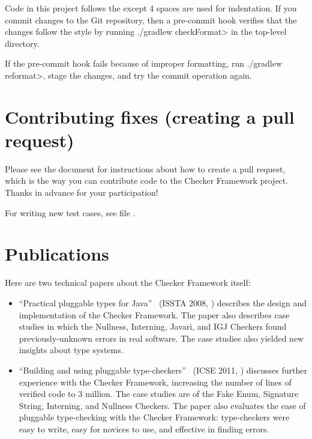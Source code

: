 Code in this project follows the
 except 4 spaces are used for indentation.  If you commit changes to the
Git repository, then a pre-commit hook verifies that the changes follow the
style by running \<./gradlew checkFormat> in the top-level directory.

If
the pre-commit hook fails
because of improper formatting, run \<./gradlew reformat>, stage the
changes, and try the commit operation again.


\section{Contributing fixes (creating a pull request)\label{pull-request}}

Please see the document
 for instructions about how to
create a pull request, which is the way you can contribute code to the
Checker Framework project.  Thanks in advance for your participation!

For writing new test cases, see file
.


\section{Publications\label{publications}\label{learning-more}}

Here are two technical papers about the Checker Framework itself:

\begin{itemize}
\item
``Practical pluggable types for Java''~\cite{PapiACPE2008}
(ISSTA 2008, )
describes the design and implementation of the Checker Framework.
The paper also describes case
studies in which the Nullness, Interning, Javari, and IGJ Checkers found
previously-unknown errors in real software.
The case studies also yielded new insights about type systems.

\item
``Building and using pluggable
type-checkers''~\cite{DietlDEMS2011}
(ICSE 2011, )
discusses further experience with the Checker Framework, increasing the
number of lines of verified code to 3 million.  The case studies are of the
Fake Enum, Signature String, Interning, and Nullness Checkers.
The paper also evaluates the ease
of pluggable type-checking with the Checker Framework:  type-checkers
were easy to write, easy for novices to use, and effective in finding
errors.
\end{itemize}

